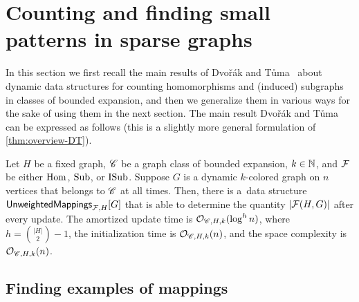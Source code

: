 \section{Counting and finding small patterns in sparse graphs}\label{sec:dvorak}





In this section we first recall the main results of Dvo\v{r}\'ak and T\r{u}ma~\cite{DvorakT13} about dynamic data structures for counting homomorphisms and (induced) subgraphs in classes of bounded expansion, and then we generalize them in various ways for the sake of using them in the next section.
The main result Dvo\v{r}\'ak and T\r{u}ma can be expressed as follows (this is a slightly more general formulation of \cref{thm:overview-DT}).%

\begin{theorem} \label{thm:dvorak-tuma}
	Let $H$ be a fixed graph, $\mathscr C$ be a graph class of bounded expansion, $k\in \mathbb{N}$, and $\mathcal{F}$ be either $\mathrm{Hom}$, $\mathrm{Sub}$, or $\mathrm{ISub}$. Suppose $G$ is a dynamic $k$-colored graph on $n$ vertices that belongs to $\mathscr C$ at all times. Then, there is a~data structure $\mathsf{UnweightedMappings}_{\mathcal{F}, H}[G]$ that is able to determine the quantity $|\mathcal{F}(H, G)|$ after every update. The amortized update time is $\mathcal{O}_{\mathscr C, H, k}(\log^h n)$, where $h = {|H| \choose 2} - 1$, the initialization time is $\mathcal{O}_{\mathscr C,H,k}(n)$, and the space complexity is $\mathcal{O}_{\mathscr C, H, k}(n)$. %
\end{theorem}

\subsection{Finding examples of mappings}


